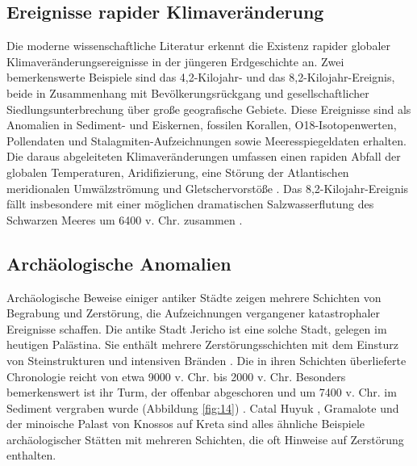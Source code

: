 \documentclass[10pt,twocolumn,letterpaper]{article}
\begin{document}
\subsection{Ereignisse rapider Klimaveränderung}

Die moderne wissenschaftliche Literatur erkennt die Existenz rapider globaler Klimaveränderungsereignisse in der jüngeren Erdgeschichte an. Zwei bemerkenswerte Beispiele sind das 4,2-Kilojahr- und das 8,2-Kilojahr-Ereignis, beide in Zusammenhang mit Bevölkerungsrückgang und gesellschaftlicher Siedlungsunterbrechung über große geografische Gebiete. Diese Ereignisse sind als Anomalien in Sediment- und Eiskernen, fossilen Korallen, O18-Isotopenwerten, Pollendaten und Stalagmiten-Aufzeichnungen sowie Meeresspiegeldaten erhalten. Die daraus abgeleiteten Klimaveränderungen umfassen einen rapiden Abfall der globalen Temperaturen, Aridifizierung, eine Störung der Atlantischen meridionalen Umwälzströmung und Gletschervorstöße \cite{90,91,92}. Das 8,2-Kilojahr-Ereignis fällt insbesondere mit einer möglichen dramatischen Salzwasserflutung des Schwarzen Meeres um 6400 v. Chr. zusammen \cite{93}.

\subsection{Archäologische Anomalien}

Archäologische Beweise einiger antiker Städte zeigen mehrere Schichten von Begrabung und Zerstörung, die Aufzeichnungen vergangener katastrophaler Ereignisse schaffen. Die antike Stadt Jericho ist eine solche Stadt, gelegen im heutigen Palästina. Sie enthält mehrere Zerstörungsschichten mit dem Einsturz von Steinstrukturen und intensiven Bränden \cite{96,97}. Die in ihren Schichten überlieferte Chronologie reicht von etwa 9000 v. Chr. bis 2000 v. Chr. Besonders bemerkenswert ist ihr Turm, der offenbar abgeschoren und um 7400 v. Chr. im Sediment vergraben wurde (Abbildung \ref{fig:14}) \cite{95}. Catal Huyuk \cite{99}, Gramalote \cite{98} und der minoische Palast von Knossos auf Kreta \cite{100,101} sind alles ähnliche Beispiele archäologischer Stätten mit mehreren Schichten, die oft Hinweise auf Zerstörung enthalten.
\end{document}
